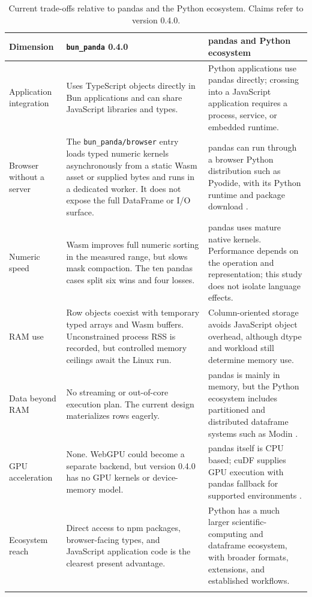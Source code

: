 \documentclass[pdflatex,sn-basic,Numbered]{sn-jnl}
\begin{document}
\begin{table}[t]
\caption{Current trade-offs relative to pandas and the Python ecosystem. Claims refer to version 0.4.0.}\label{tab:python-tradeoffs}
\begin{tabularx}{\textwidth}{@{}>{\raggedright\arraybackslash}p{29mm}>{\raggedright\arraybackslash}X>{\raggedright\arraybackslash}X@{}}
\toprule
Dimension & \texttt{bun\_panda} 0.4.0 & pandas and Python ecosystem \\
\midrule
Application integration & Uses TypeScript objects directly in Bun applications and can share JavaScript libraries and types. & Python applications use pandas directly; crossing into a JavaScript application requires a process, service, or embedded runtime. \\
Browser without a server & The \texttt{bun\_panda/browser} entry loads typed numeric kernels asynchronously from a static Wasm asset or supplied bytes and runs in a dedicated worker. It does not expose the full DataFrame or I/O surface. & pandas can run through a browser Python distribution such as Pyodide, with its Python runtime and package download \cite{pyodideBrowser}. \\
Numeric speed & Wasm improves full numeric sorting in the measured range, but slows mask compaction. The ten pandas cases split six wins and four losses. & pandas uses mature native kernels. Performance depends on the operation and representation; this study does not isolate language effects. \\
RAM use & Row objects coexist with temporary typed arrays and Wasm buffers. Unconstrained process RSS is recorded, but controlled memory ceilings await the Linux run. & Column-oriented storage avoids JavaScript object overhead, although dtype and workload still determine memory use. \\
Data beyond RAM & No streaming or out-of-core execution plan. The current design materializes rows eagerly. & pandas is mainly in memory, but the Python ecosystem includes partitioned and distributed dataframe systems such as Modin \cite{petersohn2021modin}. \\
GPU acceleration & None. WebGPU could become a separate backend, but version 0.4.0 has no GPU kernels or device-memory model. & pandas itself is CPU based; cuDF supplies GPU execution with pandas fallback for supported environments \cite{cudfPandas}. \\
Ecosystem reach & Direct access to npm packages, browser-facing types, and JavaScript application code is the clearest present advantage. & Python has a much larger scientific-computing and dataframe ecosystem, with broader formats, extensions, and established workflows. \\
\botrule
\end{tabularx}
\end{table}
\end{document}
